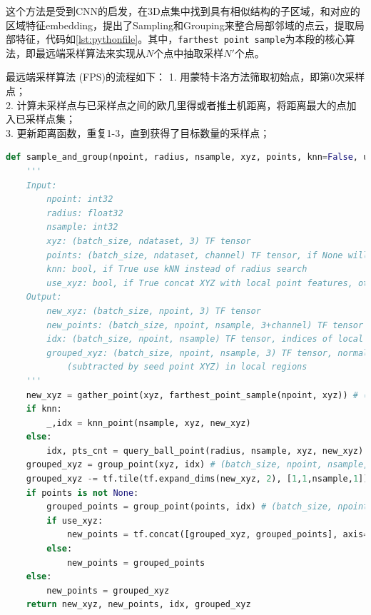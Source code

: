 这个方法是受到CNN的启发，在3D点集中找到具有相似结构的子区域，和对应的区域特征embedding，提出了Sampling和Grouping来整合局部邻域的点云，提取局部特征，代码如\ref{lst:pythonfile}。其中，\texttt{farthest point sample}为本段的核心算法，即最远端采样算法来实现从$N$个点中抽取采样$N'$个点。

最远端采样算法 (FPS)的流程如下：
1. 用蒙特卡洛方法筛取初始点，即第0次采样点； \\
2. 计算未采样点与已采样点之间的欧几里得或者推土机距离，将距离最大的点加入已采样点集； \\
3. 更新距离函数，重复1-3，直到获得了目标数量的采样点； \\

\begin{lstlisting}[language=Python, caption={Sampling}, label={lst:pythonfile}]
    def sample_and_group(npoint, radius, nsample, xyz, points, knn=False, use_xyz=True):
    '''
    Input:
        npoint: int32
        radius: float32
        nsample: int32
        xyz: (batch_size, ndataset, 3) TF tensor
        points: (batch_size, ndataset, channel) TF tensor, if None will just use xyz as points
        knn: bool, if True use kNN instead of radius search
        use_xyz: bool, if True concat XYZ with local point features, otherwise just use point features
    Output:
        new_xyz: (batch_size, npoint, 3) TF tensor
        new_points: (batch_size, npoint, nsample, 3+channel) TF tensor
        idx: (batch_size, npoint, nsample) TF tensor, indices of local points as in ndataset points
        grouped_xyz: (batch_size, npoint, nsample, 3) TF tensor, normalized point XYZs
            (subtracted by seed point XYZ) in local regions
    '''
    new_xyz = gather_point(xyz, farthest_point_sample(npoint, xyz)) # (batch_size, npoint, 3)
    if knn:
        _,idx = knn_point(nsample, xyz, new_xyz)
    else:
        idx, pts_cnt = query_ball_point(radius, nsample, xyz, new_xyz)
    grouped_xyz = group_point(xyz, idx) # (batch_size, npoint, nsample, 3)
    grouped_xyz -= tf.tile(tf.expand_dims(new_xyz, 2), [1,1,nsample,1]) # translation normalization
    if points is not None:
        grouped_points = group_point(points, idx) # (batch_size, npoint, nsample, channel)
        if use_xyz:
            new_points = tf.concat([grouped_xyz, grouped_points], axis=-1) # (batch_size, npoint, nample, 3+channel)
        else:
            new_points = grouped_points
    else:
        new_points = grouped_xyz
    return new_xyz, new_points, idx, grouped_xyz
\end{lstlisting}

